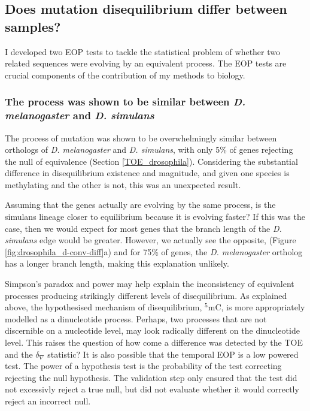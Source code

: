 \subsection{Does mutation disequilibrium differ between samples?}

I developed two EOP tests to tackle the statistical problem of whether two related sequences were evolving by an equivalent process. The EOP tests are crucial components of the contribution of my methods to biology. 

\subsubsection{The process was shown to be similar between \textit{D. melanogaster} and \textit{D. simulans} }

The process of mutation was shown to be overwhelmingly similar between orthologs of \textit{D. melanogaster} and \textit{D. simulans}, with only 5\% of genes rejecting the null of equivalence (Section \ref{TOE_drosophila}). Considering the substantial difference in disequilibrium existence and magnitude, and given one species is methylating and the other is not, this was an unexpected result. 

Assuming that the genes actually are evolving by the same process, is the simulans lineage closer to equilibrium because it is evolving faster? If this was the case, then we would expect for most genes that the branch length of the \textit{D. simulans} edge would be greater. However, we actually see the opposite, (Figure \ref{fig:drosophila_d-conv-diff}a) and for 75\% of genes, the \textit{D. melanogaster} ortholog has a longer branch length, making this explanation unlikely. 

Simpson's paradox and power may help explain the inconsistency of equivalent processes producing strikingly different levels of disequilibrium. As explained above, the hypothesised mechanism of disequilibrium, $^5$mC, is more appropriately modelled as a dinucleotide process. Perhaps, two processes that are not discernible on a nucleotide level, may look radically different on the dinucleotide level. This raises the question of how come a difference was detected by the TOE and the $\delta_\nabla$ statistic? It is also possible that the temporal EOP is a low powered test. The power of a hypothesis test is the probability of the test correcting rejecting the null hypothesis. The validation step only ensured that the test did not excessivly reject a true null, but did not evaluate whether it would correctly reject an incorrect null.

